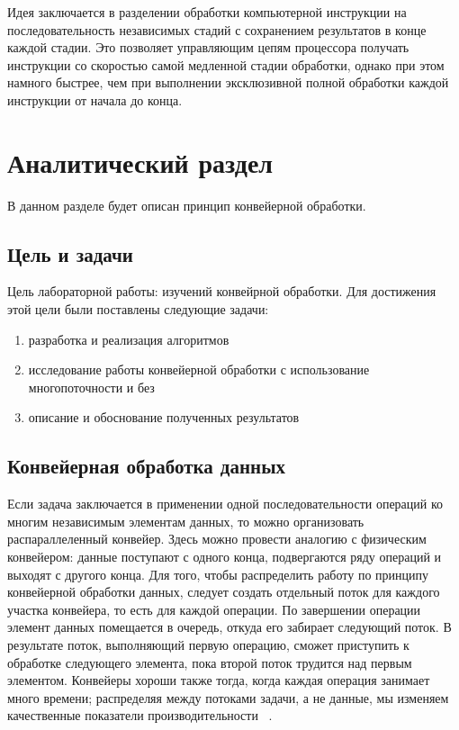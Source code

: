 \documentclass[12pt, a4paper]{report}
\begin{document}
	Идея заключается в разделении обработки компьютерной инструкции на последовательность независимых стадий с сохранением результатов в конце каждой стадии. Это позволяет управляющим цепям процессора получать инструкции со скоростью самой медленной стадии обработки, однако при этом намного быстрее, чем при выполнении эксклюзивной полной обработки каждой инструкции от начала до конца.

    \chapter{Аналитический раздел}
   	\vspace{-0.5cm}В данном разделе будет описан принцип конвейерной обработки.
   	\section{Цель и задачи}
   	\hspace{0.5cm}Цель лабораторной работы: изучений конвейрной обработки.
   	Для достижения этой цели были поставлены следующие задачи:
   	\begin{enumerate}
   		\item разработка и реализация алгоритмов
   		\item исследование работы конвейерной обработки с использование многопоточности и без
   		\item описание и обоснование полученных результатов
   	\end{enumerate}
   
	\section{Конвейерная обработка данных}
	\hspace{0.5cm}Если задача заключается в применении одной последовательности операций ко многим независимым элементам данных, то можно организовать
	распараллеленный конвейер. Здесь можно провести аналогию с физическим
	конвейером: данные поступают с одного конца, подвергаются ряду операций и выходят с другого конца.
	Для того, чтобы распределить работу по принципу конвейерной обработки данных, следует создать отдельный поток для каждого участка конвейера, то есть для каждой операции. По завершении операции элемент
	данных помещается в очередь, откуда его забирает следующий поток. В
	результате поток, выполняющий первую операцию, сможет приступить к
	обработке следующего элемента, пока второй поток трудится над первым
	элементом. Конвейеры хороши также тогда, когда каждая операция занимает много времени; распределяя между потоками задачи, а не данные, мы
	изменяем качественные показатели производительности ~\cite{devcpp}.
\end{document}
